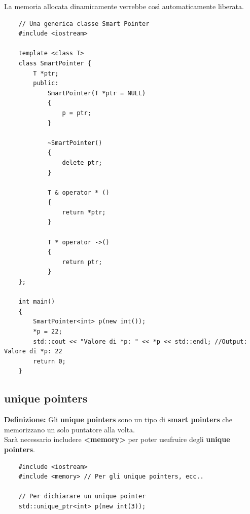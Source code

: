 \textsf{\small La memoria allocata dinamicamente verrebbe così automaticamente liberata.} \\

\begin{lstlisting}
	// Una generica classe Smart Pointer
	#include <iostream>
	
	template <class T>
	class SmartPointer {
		T *ptr;
		public:
			SmartPointer(T *ptr = NULL)
			{
				p = ptr;
			}
		
			~SmartPointer()
			{
				delete ptr;
			}
		
			T & operator * ()
			{
				return *ptr;
			}
		
			T * operator ->()
			{
				return ptr;
			}
	};

	int main()
	{
		SmartPointer<int> p(new int());
		*p = 22;
		std::cout << "Valore di *p: " << *p << std::endl; //Output: Valore di *p: 22
		return 0;
	}
\end{lstlisting}




\subsection{unique pointers}

\textsf{\small \textbf{Definizione: } Gli \textbf{unique pointers} sono un tipo di \textbf{smart pointers} che memorizzano un solo puntatore alla volta.} \\

\textsf{\small Sarà necessario includere \textbf{<memory>} per poter usufruire degli \textbf{unique pointers}.} \\

\begin{lstlisting}
	#include <iostream>
	#include <memory> // Per gli unique pointers, ecc..
	
	// Per dichiarare un unique pointer
	std::unique_ptr<int> p(new int(3));
\end{lstlisting}

